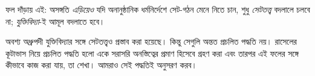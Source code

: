 \documentclass[../../../include/open-logic-section]{subfiles}
\begin{document}
ফল দাঁড়ায় এই: অসঙ্গতি \emph{এড়িয়েও} যদি অনানুষ্ঠানিক ধর্মনির্দেশে
সেট-গঠন মেনে নিতে চান, শুধু \emph{সেটতত্ত্ব} বদলালে চলবে না;
\emph{যুক্তিবিদ্যা}-ই আমূল বদলাতে হবে।

অবশ্য অধ্রুপদী যুক্তিবিদ্যার সঙ্গে সেটতত্ত্বও প্রস্তাব করা হয়েছে।
কিন্তু সেগুলি অন্তত প্রচলিত পদ্ধতি নয়। রাসেলের কূটাভাস নিয়ে
প্রচলিত পদ্ধতি হলো একে সরাসরি অনস্তিত্বের প্রমাণ হিসেবে গ্রহণ
করা এবং তারপর এই ফলের সঙ্গে কীভাবে কাজ করা যায়, তা শেখা।
আমরাও সেই পদ্ধতিই অনুসরণ করব।
\end{document}
